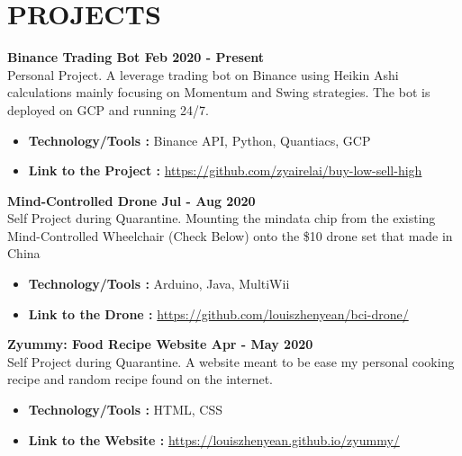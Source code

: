 \section{PROJECTS}

\textbf{Binance Trading Bot \hfill Feb 2020 - Present} \vspace{0.1cm} \\
    Personal Project. A leverage trading bot on Binance using Heikin Ashi calculations mainly focusing on Momentum and Swing strategies. The bot is deployed on GCP and running 24/7. \vspace{0.2cm}
    \begin{itemize}
        \item \textbf{Technology/Tools :} Binance API, Python, Quantiacs, GCP
        \item \textbf{Link to the Project :} \url{https://github.com/zyairelai/buy-low-sell-high}
    \end{itemize}

\textbf{Mind-Controlled Drone \hfill Jul - Aug 2020} \vspace{0.1cm} \\
    Self Project during Quarantine. Mounting the mindata chip from the existing Mind-Controlled Wheelchair (Check Below) onto the \$10 drone set that made in China \vspace{0.2cm}
    \begin{itemize}
        \item \textbf{Technology/Tools :} Arduino, Java, MultiWii
        \item \textbf{Link to the Drone :} \url{https://github.com/louiszhenyean/bci-drone/}
    \end{itemize}
    
\textbf{Zyummy: Food Recipe Website \hfill Apr - May 2020} \vspace{0.1cm} \\
    Self Project during Quarantine. A website meant to be ease my personal cooking recipe and random recipe found on the internet.  \vspace{0.2cm}
    \begin{itemize}
        \item \textbf{Technology/Tools :} HTML, CSS
        \item \textbf{Link to the Website :} \url{https://louiszhenyean.github.io/zyummy/}
    \end{itemize}

